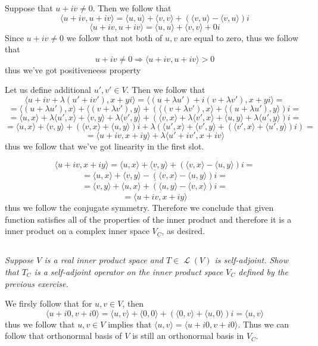 \documentclass[11pt,oneside,titlepage]{book}
\DeclareMathOperator \map {\mathcal {L}}
\newcommand{\eangle}[1]{\langle #1 \rangle}
\begin{document}
Suppose that $u + iv \neq 0$. Then we follow that
$$\eangle{u + iv, u + iv} = \eangle{u, u} + \eangle{v, v} + (\eangle{v, u} - \eangle{v, u})i$$
$$\eangle{u + iv, u + iv} = \eangle{u, u} + \eangle{v, v} + 0i$$
Since $u + iv \neq 0$ we follow that not both of $u, v$ are equal to zero, thus we follow that
$$u + iv \neq  0 \Rightarrow \eangle{u + iv, u + iv} > 0$$
thus we've got positiveneess property


Let us define additional $u', v' \in V$. Then we follow that
$$\eangle{u + iv + \lambda(u' + iv'), x + yi} =
\eangle{(u + \lambda u') + i(v + \lambda v'), x + yi} = $$
$$ = 
\eangle{(u + \lambda u'), x} + \eangle{(v + \lambda v'), y} + 
(\eangle{(v + \lambda v'), x} + \eangle{(u + \lambda u'), y})i =
$$
$$ = 
\eangle{u, x} + \lambda \eangle{u', x} + \eangle{v, y} + \lambda\eangle{v', y} + 
(\eangle{v, x} + \lambda \eangle{v', x} + \eangle{u, y} + \lambda\eangle{u', y})i =
$$
$$ = 
\eangle{u, x} + \eangle{v, y} + (\eangle{v, x} +  \eangle{u, y}) i +
\lambda ( \eangle{u', x} + \eangle{v', y} + 
(\eangle{v', x}  + \eangle{u', y})i) =$$
$$ =
\eangle{u + iv, x + iy} + \lambda \eangle{u' + iv', x + iv}
$$
thus we follow that we've got linearity in the first slot.

$$\eangle{u + iv, x + iy} = \eangle{u, x} + \eangle{v, y} +
(\eangle{v, x} - \eangle{u, y})i = $$
$$ =
\overline{  \eangle{u, x} + \eangle{v, y} - (\eangle{v, x} - \eangle{u, y})i} = $$
$$ =
\overline{\eangle{v, y} + \eangle{u, x} + (\eangle{u, y} - \eangle{v, x})i} = $$
$$ = \overline{\eangle{u + iv, x + iy}}$$
thus we follow the conjugate symmetry. Therefore we conclude that given function
satisfies all of the properties of the inner product and therefore it is a
inner product on a complex inner space $V_C$, as desired.

\subsection{}

\textit{Suppose $V$ is a real inner product space and $T \in \map(V)$ is self-adjoint.
  Show that $T_C$ is a self-adjoint operator on the inner product space $V_C$ defined
  by the previous exercise.}

We firsly follow that for $u, v \in V$, then
$$\eangle{u + i0, v + i0} = \eangle{u, v} + \eangle{0, 0} + (\eangle{0, v} + \eangle{u, 0})i
= \eangle{u, v}$$
thus we follow that $u, v \in V$ implies that  $\eangle{u, v} = \eangle{u + i0, v + i0}$.
Thus we can follow that orthonormal basis of $V$ is still an orthonormal basis in $V_C$.
\end{document}
